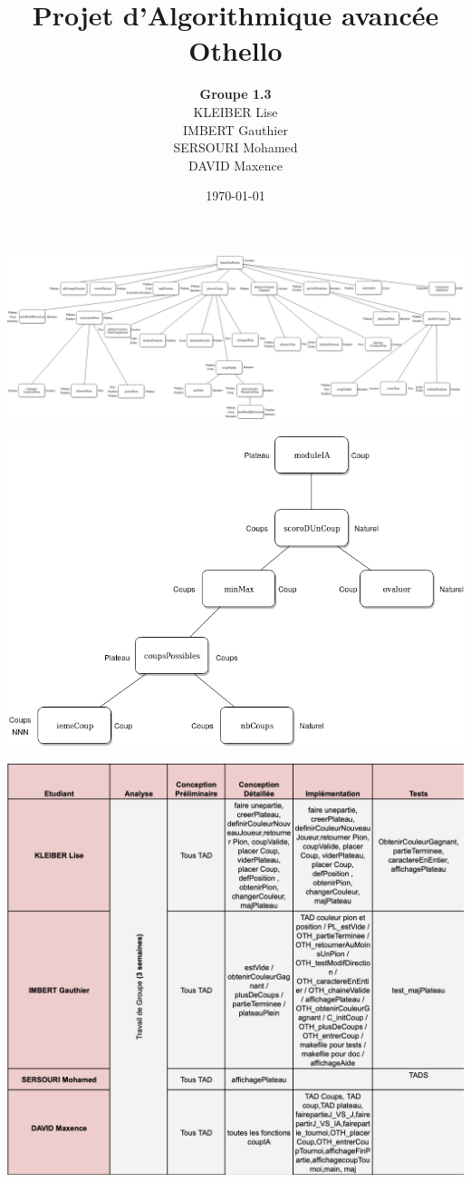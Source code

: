 \documentclass[a4paper,12pt]{article}
\title{Projet d'Algorithmique avancée\\ \huge Othello}
\author{\textbf{Groupe 1.3}\\KLEIBER Lise\\IMBERT Gauthier\\SERSOURI Mohamed\\DAVID Maxence}
\date{\today}
\begin{document}
\maketitle
\newpage
\tableofcontents
\newpage

\newpage
\begin{landscape}
\includegraphics[scale=0.30]{AnalyseDescendante.png}
\end{landscape}
\newpage
\newpage
\includegraphics[scale=0.35]{Analyse_Descendante_IA.png}
\newpage

\newpage

\newpage

\newpage

\newpage
\includegraphics[scale=0.75]{travail.png}
\newpage

\newpage

\end{document}
